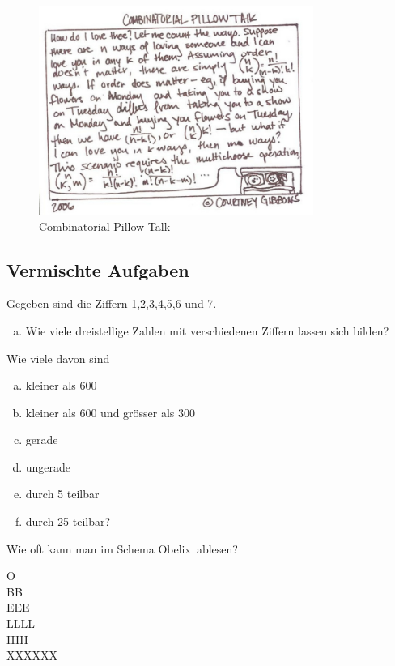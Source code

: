 \documentclass[%
11pt,%
twoside,%
titlepage,%
german,%
headsepline%
]{scrartcl}
\begin{document}
\begin{figure}
\begin{center}
\includegraphics[width=0.8\textwidth]{pictures/pillowtalk}
\caption{Combinatorial Pillow-Talk}
\end{center}
\end{figure}

\subsection{Vermischte Aufgaben}

 
 \begin{ueb}[Dreisteller]
 Gegeben sind die Ziffern 1,2,3,4,5,6 und 7.
 \begin{enumerate}[a)]
 \item Wie viele dreistellige Zahlen mit verschiedenen
Ziffern lassen sich bilden?
 \end{enumerate}
 Wie viele davon sind
 \begin{enumerate}[a)]
 \addtocounter{enumi}{1}
 \item kleiner als 600
 \item kleiner als 600 und grösser als 300
 \item gerade
 \item ungerade
 \item durch 5 teilbar
 \item durch 25 teilbar?
 \end{enumerate}
 \end{ueb}
 
 \begin{ueb}[Obelix]
 Wie oft kann man im Schema \glqq Obelix\grqq\ ablesen?
 \begin{center}
 \ttfamily
 O\\
 B\q B\\
 E\q E\q E\\
 L\q L\q L\q L\\
 I\q I\q I\q I\q I\q\\
 X\q X\q X\q X\q X\q X
 \end{center}
 \end{ueb}
\end{document}
